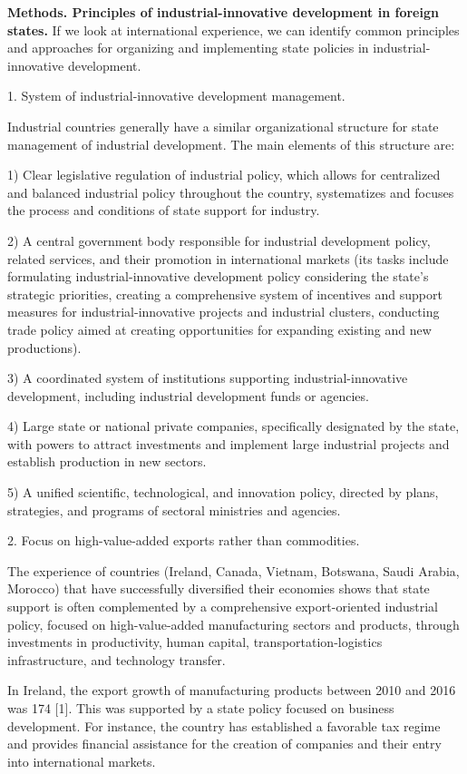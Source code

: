 \begin{multicols}{2}
{\bfseries Methods. Principles of industrial-innovative development in
foreign states.} If we look at international experience, we can identify
common principles and approaches for organizing and implementing state
policies in industrial-innovative development.

1. System of industrial-innovative development management.

Industrial countries generally have a similar organizational structure
for state management of industrial development. The main elements of
this structure are:

1) Clear legislative regulation of industrial policy, which allows for
centralized and balanced industrial policy throughout the country,
systematizes and focuses the process and conditions of state support for
industry.

2) A central government body responsible for industrial development
policy, related services, and their promotion in international markets
(its tasks include formulating industrial-innovative development policy
considering the state's strategic priorities, creating a comprehensive
system of incentives and support measures for industrial-innovative
projects and industrial clusters, conducting trade policy aimed at
creating opportunities for expanding existing and new productions).

3) A coordinated system of institutions supporting industrial-innovative
development, including industrial development funds or agencies.

4) Large state or national private companies, specifically designated by
the state, with powers to attract investments and implement large
industrial projects and establish production in new sectors.

5) A unified scientific, technological, and innovation policy, directed
by plans, strategies, and programs of sectoral ministries and agencies.

2. Focus on high-value-added exports rather than commodities.

The experience of countries (Ireland, Canada, Vietnam, Botswana, Saudi
Arabia, Morocco) that have successfully diversified their economies
shows that state support is often complemented by a comprehensive
export-oriented industrial policy, focused on high-value-added
manufacturing sectors and products, through investments in productivity,
human capital, transportation-logistics infrastructure, and technology
transfer.

In Ireland, the export growth of manufacturing products between 2010 and
2016 was 174 {[}1{]}. This was supported by a state policy focused on
business development. For instance, the country has established a
favorable tax regime and provides financial assistance for the creation
of companies and their entry into international markets.


\end{multicols}
